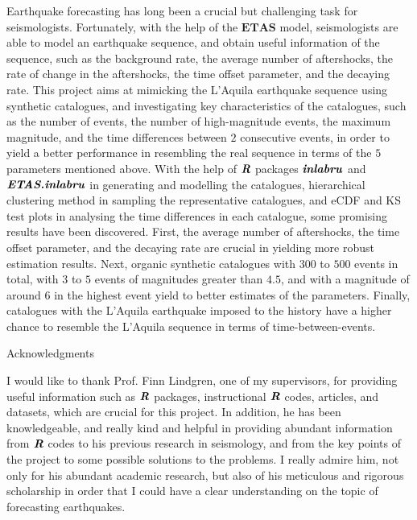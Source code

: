 \documentclass[11pt,twoside]{article}
\numberwithin{Theorem}{section}
\numberwithin{Definition}{section}
\numberwithin{Lemma}{section}
\numberwithin{Algorithm}{section}
\numberwithin{equation}{section}
\begin{document}
Earthquake forecasting has long been a crucial but challenging task for seismologists. Fortunately, with the help of the $\textbf{ETAS}$ model, seismologists are able to model an earthquake sequence, and obtain useful information of the sequence, such as the background rate, the average number of aftershocks, the rate of change in the aftershocks, the time offset parameter, and the decaying rate. This project aims at mimicking the L'Aquila earthquake sequence using synthetic catalogues, and investigating key characteristics of the catalogues, such as the number of events, the number of high-magnitude events, the maximum magnitude, and the time differences between $2$ consecutive events, in order to yield a better performance in resembling the real sequence in terms of the $5$ parameters mentioned above. With the help of $\textbf{\textit{R}}$ packages $\textbf{\textit{inlabru}}$ and $\textbf{\textit{ETAS.inlabru}}$ in generating and modelling the catalogues, hierarchical clustering method in sampling the representative catalogues, and eCDF and KS test plots in analysing the time differences in each catalogue, some promising results have been discovered. First, the average number of aftershocks, the time offset parameter, and the decaying rate are crucial in yielding more robust estimation results. Next, organic synthetic catalogues with $300$ to $500$ events in total, with $3$ to $5$ events of magnitudes greater than $4.5$, and with a magnitude of around $6$ in the highest event yield to better estimates of the parameters. Finally, catalogues with the L'Aquila earthquake imposed to the history have a higher chance to resemble the L'Aquila sequence in terms of time-between-events.

\clearpage

\begin{center}
\Large{Acknowledgments}
\end{center}

I would like to thank Prof. Finn Lindgren, one of my supervisors, for providing useful information such as $\textbf{\textit{R}}$ packages, instructional $\textbf{\textit{R}}$ codes, articles, and datasets, which are crucial for this project. In addition, he has been knowledgeable, and really kind and helpful in providing abundant information from $\textbf{\textit{R}}$ codes to his previous research in seismology, and from the key points of the project to some possible solutions to the problems. I really admire him, not only for his abundant academic research, but also of his meticulous and rigorous scholarship in order that I could have a clear understanding on the topic of forecasting earthquakes.
\end{document}
